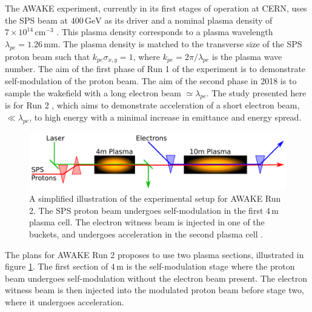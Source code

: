 \documentclass[aps,prstab,reprint,amsmath,amssymb,groupedaddress]{revtex4-1}
\newcommand{\unit}[1]{\,\mathrm{#1}}
\newcommand{\nexp}[1]{\times 10^{#1}}
\begin{document}
The AWAKE experiment, currently in its first stages of operation at CERN, uses the SPS beam at $400\unit{GeV}$ as its
driver and a nominal plasma density of $7\nexp{14}\unit{cm}^{-3}$ \cite{gschwendtner:2016}. This plasma density
corresponds to a plasma wavelength $\lambda_{pe} = 1.26\unit{mm}$. The plasma density is matched to the transverse size
of the SPS proton beam such that $k_{pe}\sigma_{x,y} = 1$, where $k_{pe} = 2\pi/\lambda_{pe}$ is the plasma wave number.
The aim of the first phase of Run 1 of the experiment is to demonstrate self-modulation of the proton beam. The aim of
the second phase in 2018 is to sample the wakefield with a long electron beam $\simeq\lambda_{pe}$. The study presented
here is for Run 2 \cite{adli:2016}, which aims to demonstrate acceleration of a short electron beam, $\ll\lambda_{pe}$,
to high energy with a minimal increase in emittance and energy spread.

\begin{figure}[hbt]
    \includegraphics[width=0.99\linewidth,trim={1mm 2mm 1mm 2mm},clip]{figures/figAWAKE}
    \caption{\label{Fig:AWAKER2} A simplified illustration of the experimental setup for AWAKE Run 2. The SPS proton
        beam undergoes self-modulation in the first $4\unit{m}$ plasma cell. The electron witness beam is injected in
        one of the buckets, and undergoes acceleration in the second plasma cell \cite{berglyd_olsen:2015, adli:2016}.}
\end{figure}

The plans for AWAKE Run 2 proposes to use two plasma sections, illustrated in figure \ref{Fig:AWAKER2}. The first
section of $4\unit{m}$ is the self-modulation stage where the proton beam undergoes self-modulation without the electron
beam present. The electron witness beam is then  injected into the modulated proton beam before stage two, where it
undergoes acceleration.
\end{document}
